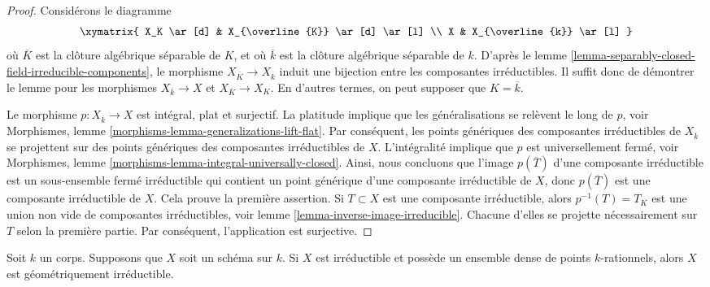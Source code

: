 \begin{proof}
Considérons le diagramme
$$
\xymatrix{
X_K \ar[d] & X_{\overline{K}} \ar[d] \ar[l] \\
X & X_{\overline{k}} \ar[l]
}
$$
où $\overline{K}$ est la clôture algébrique séparable de $K$,
et où $\overline{k}$ est la clôture algébrique séparable de
$k$. D'après le lemme
\ref{lemma-separably-closed-field-irreducible-components}, le
morphisme $X_{\overline{K}} \to X_{\overline{k}}$ induit une bijection
entre les composantes irréductibles. Il suffit donc de démontrer le
lemme pour les morphismes $X_{\overline{k}} \to X$ et $X_{\overline{K}}
\to X_K$. En d'autres termes, on peut supposer que $K = \overline{k}$.

\medskip\noindent
Le morphisme $p : X_{\overline{k}} \to X$ est intégral, plat et
surjectif. La platitude implique que les généralisations se relèvent
le long de $p$, voir Morphismes, lemme
\ref{morphisms-lemma-generalizations-lift-flat}. Par conséquent, les
points génériques des composantes irréductibles de $X_{\overline{k}}$ se
projettent sur des points génériques des composantes irréductibles de
$X$. L'intégralité implique que $p$ est universellement fermé, voir
Morphismes, lemme \ref{morphisms-lemma-integral-universally-closed}.
Ainsi, nous concluons que l'image $p(\overline{T})$ d'une composante
irréductible est un sous-ensemble fermé irréductible qui contient un point
générique d'une composante irréductible de $X$, donc $p(\overline{T})$ est
une composante irréductible de $X$. Cela prouve la première assertion. Si
$T \subset X$ est une composante irréductible, alors $p^{-1}(T) =T_K$ est
une union non vide de composantes irréductibles, voir lemme
\ref{lemma-inverse-image-irreducible}. Chacune d'elles se projette nécessairement
sur $T$ selon la première partie. Par conséquent, l'application est surjective.
\end{proof}

\begin{lemma}
\label{lemma-irreducible-dense-rational-points-geometrically-irreducible}
Soit $k$ un corps. Supposons que $X$ soit un schéma
sur $k$. Si $X$ est irréductible et possède un ensemble dense de
points $k$-rationnels, alors $X$ est géométriquement irréductible.
\end{lemma}

